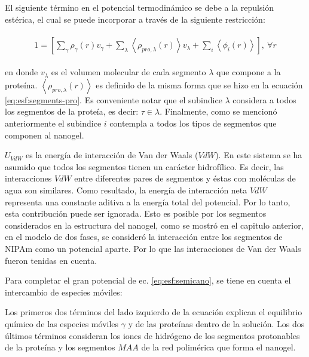El siguiente t\'ermino en el potencial termodin\'amico se debe a la repulsi\'on est\'erica, el cual se puede incorporar a trav\'es de la siguiente restricci\'on:

\begin{align}
	\begin{aligned}
		1=  {\left[\sum_{\gamma}\rho_\gamma(r) v_\gamma + \sum_\lambda{\left<\rho_{pro,\lambda}(r)\right>v_\lambda} + \sum_i{\left<\phi_i(r)\right>}\right]},~ \forall r
	\end{aligned}
	\label{eq:esf:constraint}
\end{align}


\noindent en donde $v_\lambda$  es el volumen molecular de cada segmento $\lambda$  que compone a la prote\'ina.
$\left<\rho_{pro,\lambda}(r)\right>$  es definido de la misma forma que se hizo en la ecuaci\'on \ref{eq:esf:segments-pro}.
Es conveniente notar que el subindice $\lambda$ considera a todos los segmentos de la prote\'ia, es decir: $ \tau \in \lambda$.
Finalmente, como se mencion\'o anteriormente el subindice $i$  contempla a todos los tipos de segmentos que componen al nanogel.



$U_{VdW}$ es la energ\'ia de interacci\'on de Van der Waals ($VdW$). En este sistema se ha asumido que todos los segmentos tienen un car\'acter hidrof\'ilico. Es decir, las interacciones $VdW$ entre diferentes pares de segmentos y \'estas con mol\'eculas de agua son similares. Como resultado, la energ\'ia de interacci\'on neta $VdW$ representa una constante aditiva a la energ\'ia total del potencial.
Por lo tanto, esta contribuci\'on puede ser ignorada. 
Esto es posible por los segmentos considerados en la estructura del nanogel, como se mostr\'o en el capitulo anterior, en el modelo de dos fases, se consider\'o la interacci\'on entre los segmentos de NIPAm como un potencial aparte. Por lo que las interacciones de Van der Waals fueron tenidas en cuenta.



Para completar el gran potencial de ec. \ref{eq:esf:semicano}, se tiene en cuenta el intercambio de especies m\'oviles:

Los primeros dos t\'erminos del lado izquierdo de la ecuaci\'on explican el equilibrio qu\'imico de las especies m\'oviles $\gamma$ y de las prote\'inas dentro de la soluci\'on.
Los dos \'ultimos t\'erminos consideran los iones de hidr\'ogeno de los segmentos protonables de la prote\'ina y los segmentos $MAA$ de la red polim\'erica que forma el nanogel.


